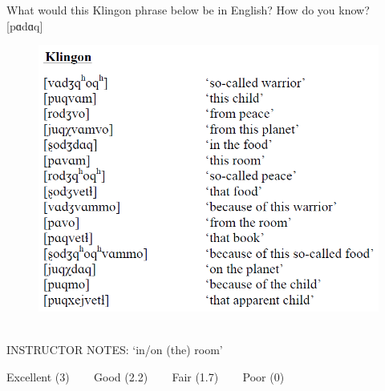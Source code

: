 \documentclass[12pt]{article}
\begin{document}
What would this Klingon phrase below be in English? How do you know?\\

{[pɑdɑq]}

\begin{figure}[H]
\includegraphics{../images/klingon.png}
\end{figure}

~\\
INSTRUCTOR NOTES: ‘in/on (the) room’


\vfill
Excellent (3) ~~~ Good (2.2) ~~~ Fair (1.7) ~~~ Poor (0)
\newpage

\begin{center}
\textbf{{\color{red}{\HUGE END OF EXAM}}}\\

\end{center}
\newpage
\end{document}
